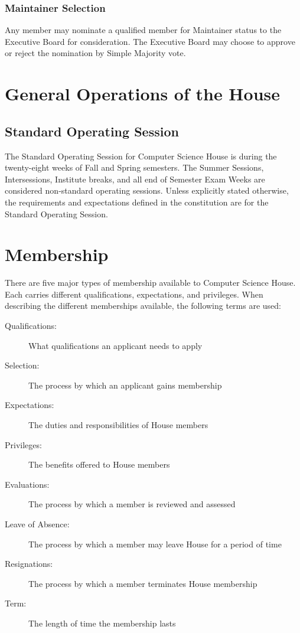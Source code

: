 \documentclass{article}
\newcommand{\article}[1]{\section{#1} \label{#1}}
\newcommand{\asection}[1]{\subsection{#1} \label{#1}}
\newcommand{\asubsection}[1]{\subsubsection{#1} \label{#1}}
\begin{document}
\asubsection{Maintainer Selection}
Any member may nominate a qualified member for Maintainer status to the Executive Board for consideration.
The Executive Board may choose to approve or reject the nomination by Simple Majority vote.

\article{General Operations of the House}
\asection{Standard Operating Session}
The Standard Operating Session for Computer Science House is during the twenty-eight weeks of Fall and Spring semesters.
The Summer Sessions, Intersessions, Institute breaks, and all end of Semester Exam Weeks are considered non-standard operating sessions.
Unless explicitly stated otherwise, the requirements and expectations defined in the constitution are for the Standard Operating Session.

\article{Membership}
There are five major types of membership available to Computer Science House.
Each carries different qualifications, expectations, and privileges.
When describing the different memberships available, the following terms are used:
\begin{description}
	\item[Qualifications:] What qualifications an applicant needs to apply
	\item[Selection:] The process by which an applicant gains membership
	\item[Expectations:] The duties and responsibilities of House members
	\item[Privileges:] The benefits offered to House members
	\item[Evaluations:] The process by which a member is reviewed and assessed
	\item[Leave of Absence:] The process by which a member may leave House for a period of time
	\item[Resignations:] The process by which a member terminates House membership
	\item[Term:] The length of time the membership lasts
\end{description}
\end{document}
